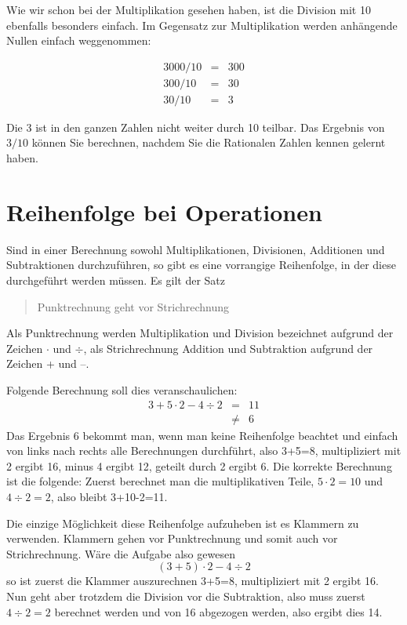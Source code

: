 Wie wir schon bei der Multiplikation gesehen haben, ist die Division mit 10 ebenfalls besonders einfach. Im Gegensatz zur Multiplikation werden anhängende Nullen einfach weggenommen:

\begin{eqnarray*}
3000 / 10 &=& 300 \\
300 / 10 &=& 30 \\
30 / 10 &=& 3
\end{eqnarray*}

Die 3 ist in den ganzen Zahlen nicht weiter durch 10 teilbar. Das Ergebnis von $3/10$ können Sie berechnen, nachdem Sie die Rationalen Zahlen kennen gelernt haben. 

\section{Reihenfolge bei Operationen}

Sind in einer Berechnung sowohl Multiplikationen, Divisionen, Additionen und Subtraktionen durchzuführen, so gibt es eine vorrangige Reihenfolge, in der diese durchgeführt werden müssen. Es gilt der Satz

\begin{quote}
Punktrechnung geht vor Strichrechnung
\end{quote}

\noindent Als Punktrechnung werden Multiplikation und Division bezeichnet aufgrund der Zeichen $\cdot$ und $\div$, als Strichrechnung Addition und Subtraktion aufgrund der Zeichen + und --.

Folgende Berechnung soll dies veranschaulichen:
\begin{eqnarray*}
3+5\cdot 2-4\div 2 &=&  11 \\
&\ne & 6
\end{eqnarray*}
Das Ergebnis 6 bekommt man, wenn man keine Reihenfolge beachtet und einfach von links nach rechts alle Berechnungen durchführt, also 3+5=8, multipliziert mit 2 ergibt 16, minus 4 ergibt 12, geteilt durch 2 ergibt 6. Die korrekte Berechnung ist die folgende: Zuerst berechnet man die multiplikativen Teile, $5\cdot 2=10$ und $4\div 2=2$, also bleibt 3+10-2=11.

Die einzige Möglichkeit diese Reihenfolge aufzuheben ist es Klammern zu verwenden. Klammern gehen vor Punktrechnung und somit auch vor Strichrechnung. Wäre die Aufgabe also gewesen
\[
(3+5)\cdot 2-4\div 2
\]
so ist zuerst die Klammer auszurechnen 3+5=8, multipliziert mit 2 ergibt 16. Nun geht aber trotzdem die Division vor die Subtraktion, also muss zuerst $4\div 2=2$ berechnet werden und von 16 abgezogen werden, also ergibt dies 14.

